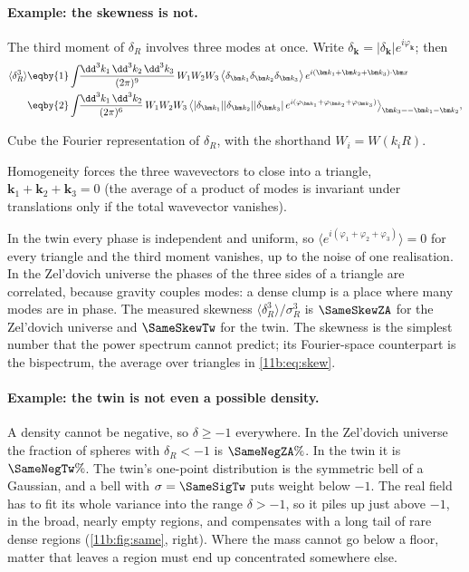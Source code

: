 \paragraph{Example: the skewness is not.}
The third moment of $\delta_R$ involves three modes at once. Write
$\delta_{\bm k}=|\delta_{\bm k}|e^{i\varphi_{\bm k}}$; then
\begin{align}
  \langle\delta_R^3\rangle
  &\eqby{1}\int\!\!\frac{\dd^3k_1\,\dd^3k_2\,\dd^3k_3}{(2\pi)^9}\,
     W_1W_2W_3\,
     \bigl\langle\delta_{\bm k_1}\delta_{\bm k_2}\delta_{\bm k_3}\bigr\rangle\,
     e^{i(\bm k_1+\bm k_2+\bm k_3)\cdot\bm x}\nonumber\\
  &\eqby{2}\int\!\!\frac{\dd^3k_1\,\dd^3k_2}{(2\pi)^6}\,
     W_1W_2W_3\,
     \bigl\langle|\delta_{\bm k_1}||\delta_{\bm k_2}||\delta_{\bm k_3}|\,
     e^{i(\varphi_{\bm k_1}+\varphi_{\bm k_2}+\varphi_{\bm k_3})}\bigr\rangle_{\bm k_3=-\bm k_1-\bm k_2},
  \label{11b:eq:skew}
\end{align}
\begin{explain}
  \item Cube the Fourier representation of $\delta_R$, with the shorthand
        $W_i=W(k_iR)$.
  \item Homogeneity forces the three wavevectors to close into a triangle,
        $\bm k_1+\bm k_2+\bm k_3=0$ (the average of a product of modes is
        invariant under translations only if the total wavevector vanishes).
\end{explain}
In the twin every phase is independent and uniform, so
$\langle e^{i(\varphi_1+\varphi_2+\varphi_3)}\rangle=0$ for every triangle and the
third moment vanishes, up to the noise of one realisation. In the Zel'dovich
universe the phases of the three sides of a triangle are correlated, because
gravity couples modes: a dense clump is a place where many modes are in phase.
The measured skewness $\langle\delta_R^3\rangle/\sigma_R^3$ is $\SameSkewZA$ for
the Zel'dovich universe and $\SameSkewTw$ for the twin. The skewness is the
simplest number that the power spectrum cannot predict; its Fourier-space
counterpart is the bispectrum, the average over triangles in
\eqref{11b:eq:skew}.

\paragraph{Example: the twin is not even a possible density.}
A density cannot be negative, so $\delta\ge-1$ everywhere. In the Zel'dovich
universe the fraction of spheres with $\delta_R<-1$ is $\SameNegZA\%$. In the
twin it is $\SameNegTw\%$. The twin's one-point distribution is the symmetric
bell of a Gaussian, and a bell with $\sigma=\SameSigTw$ puts weight below $-1$.
The real field has to fit its whole variance into the range $\delta>-1$, so it
piles up just above $-1$, in the broad, nearly empty regions, and compensates with
a long tail of rare dense regions (\cref{11b:fig:same}, right). Where the mass
cannot go below a floor, matter that leaves a region must end up concentrated
somewhere else.

